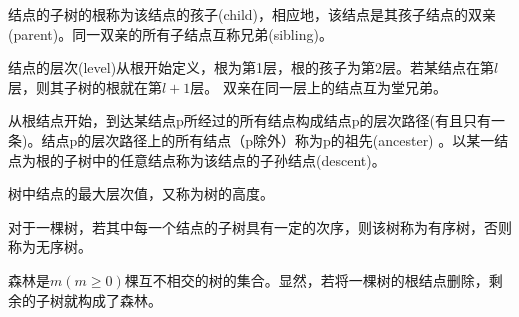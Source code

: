 \begin{frame}\ft{\subsecname}
\begin{dingyi}
结点的子树的根称为该结点的\textcolor{acolor5}{孩子(child)}，相应地，该结点是其孩子结点的\textcolor{acolor5}{双亲(parent)}。同一双亲的所有子结点互称\textcolor{acolor5}{兄弟(sibling)}。
\end{dingyi}

\begin{figure}
\centering
    
\end{figure}
\end{frame}
%
\begin{frame}\ft{\subsecname}
\begin{dingyi}[层次、堂兄弟结点]
结点的\textcolor{acolor5}{层次(level)}从根开始定义，根为第1层，根的孩子为第2层。若某结点在第$l$层，则其子树的根就在第$l+1$层。 双亲在同一层上的结点互为\textcolor{acolor5}{堂兄弟}。
\end{dingyi}

\begin{figure}
\centering
    
\end{figure}
\end{frame}
%
%
\begin{frame}\ft{\subsecname}
\begin{dingyi}[结点的层次路径、祖先、子孙]
从根结点开始，到达某结点p所经过的所有结点构成结点p的\textcolor{acolor5}{层次路径}(有且只有一条)。结点p的层次路径上的所有结点（p除外）称为p的\textcolor{acolor5}{祖先(ancester)} 。以某一结点为根的子树中的任意结点称为该结点的\textcolor{acolor5}{子孙结点(descent)}。
\end{dingyi}
\end{frame}
%
%
\begin{frame}\ft{\subsecname}
\begin{figure}
\centering
    
\end{figure}
\end{frame}


\begin{frame}\ft{\subsecname}
\begin{dingyi}
树中结点的最大层次值，又称为树的\textcolor{acolor5}{高度}。
\end{dingyi}
    
\begin{figure}
\centering

\end{figure}
\end{frame}
%
%
\begin{frame}\ft{\subsecname}
\begin{dingyi}[有序树和无序树]
对于一棵树，若其中每一个结点的子树具有一定的次序，则该树称为\textcolor{acolor5}{有序树}，否则称为\textcolor{acolor5}{无序树}。
\end{dingyi}

\begin{dingyi}[森林-forest]
\textcolor{acolor5}{森林}是$m(m\ge0)$棵互不相交的树的集合。显然，若将一棵树的根结点删除，剩余的子树就构成了森林。
\end{dingyi}
\end{frame}
%
